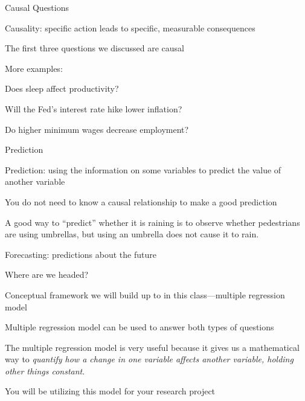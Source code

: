 \documentclass{./../div_teaching_slides}
\begin{document}
\begin{frame}{Causal Questions}
\begin{witemize}
  \item Causality: specific action leads to specific, measurable consequences 
  \item The first three questions we discussed are causal
  \item More examples:\\
  \begin{witemize}
  \normalsize
  \item Does sleep affect productivity?
  \item Will the Fed's interest rate hike lower inflation?
  \item Do higher minimum wages decrease employment?
\end{witemize}
\end{witemize}
\end{frame}

\begin{frame}{Prediction}
\begin{witemize}
  \item Prediction: using the information on some variables to predict the value of another variable
  \item You do not need to know a causal relationship to make a good prediction
  \item A good way to ``predict'' whether it is raining is to observe whether pedestrians are
using umbrellas, but using an umbrella does not cause it to rain.
\item Forecasting: predictions about the future
\end{witemize}
\end{frame}

\begin{frame}{Where are we headed?}
\begin{witemize}
  \item Conceptual framework we will build up to in this class---multiple regression model 
  \item Multiple regression model can be used to answer both types of questions 
  \item The multiple regression model is very useful because it gives us a mathematical way to \textit{quantify how a change in one variable affects another variable, holding other things constant}.
  \item You will be utilizing this model for your research project
\end{witemize}
\end{frame}
\end{document}

